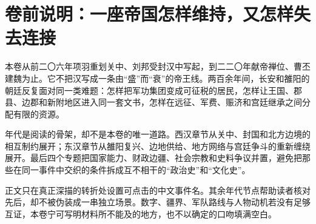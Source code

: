 \chapter*{卷前说明：一座帝国怎样维持，又怎样失去连接}

本卷从前二〇六年项羽重划关中、刘邦受封汉中写起，到二二〇年献帝禅位、曹丕建魏为止。它不把汉写成一条由“盛”而“衰”的帝王线。两百余年间，长安和雒阳的朝廷反复面对同一类难题：怎样把军功集团变成可征税的居民，怎样让王国、郡县、边郡和新附地区进入同一套文书，怎样在远征、军费、赈济和宫廷继承之间分配有限的资源。

年代是阅读的骨架，却不是本卷的唯一道路。西汉章节从关中、封国和北方边境的相互制约展开；东汉章节从雒阳复兴、边地供给、地方网络与宫廷争斗的重新缠绕展开。最后四个专题把国家能力、财政边疆、社会宗教和史料争议并置，避免把那些在同一事件中交织的条件拆成互不相干的“政治史”和“文化史”。

正文只在真正深描的转折处设置可点击的中文事件名。其余年代节点帮助读者核对先后，却不被伪装成一串独立场景。数字、疆界、军队路线与人物动机若没有足够互证，本卷宁可写明材料所不能及的地方，也不以确定的口吻填满空白。
